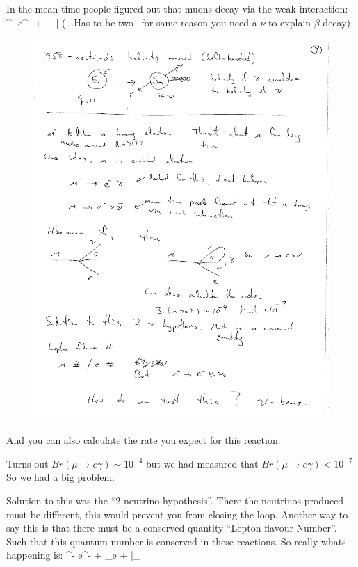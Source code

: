 {In the mean time people figured out that muons decay via the weak interaction: 
\be
\mu^- \rightarrow e^- + \nu + \bar{\nu}
\ee
(...Has to be two \nus\ for same reason you need a $\nu$ to explain $\beta$ decay) 

\begin{figure}[h!]
\centering
\includegraphics[width=1.0\textwidth]{./MuToEg.pdf}
\end{figure}

And you can also calculate the rate you expect for this reaction. 

Turns out $Br(\mu\rightarrow e \gamma) \sim 10^{-4}$ but we had measured that $Br(\mu\rightarrow e \gamma) < 10^{-7}$
So we had a big problem. 

Solution to this was the ``2 neutrino hypothesis''. 
There the neutrinos produced must be different, this would prevent you from closing the loop. 
Another way to say this is that there must be a conserved quantity ``Lepton flavour Number''. 
Such that this quantum number is conserved in these reactions.  
So really whats happening is:
\be
\mu^- \rightarrow e^- + \nu_e + \bar{\nu}_\mu
\ee

}
